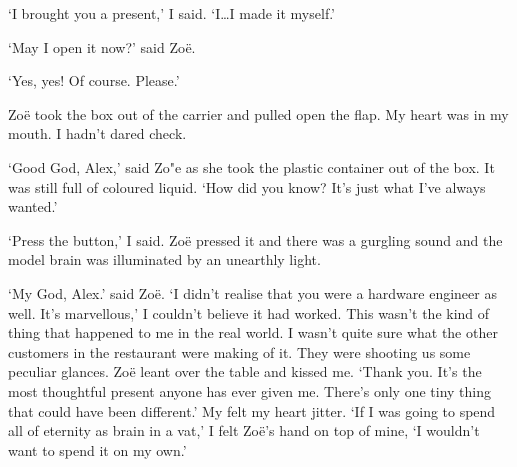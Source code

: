 `I brought you a present,' I said. `I\dots I made it myself.'

`May I open it now?' said Zoë.

`Yes, yes! Of course. Please.'

Zoë took the box out of the carrier and pulled open the flap. My
heart was in my mouth. I hadn't dared check.

`Good God, Alex,' said Zo{"e} as she took the plastic container out
of the box. It was still full of coloured liquid. `How did you know?
It's just what I've always wanted.'

`Press the button,' I said. Zoë pressed it and there was a
gurgling sound and the model brain was illuminated by an unearthly
light.

`My God, Alex.' said Zoë. `I didn't realise that you were a
hardware engineer as well. It's marvellous,' I couldn't believe it
had worked. This wasn't the kind of thing that happened to me in the
real world. I wasn't quite sure what the other customers in the
restaurant were making of it. They were shooting us some peculiar
glances. Zoë leant over the table and kissed me. `Thank you.
It's the most thoughtful present anyone has ever given me. There's
only one tiny thing that could have been different.' My felt my
heart jitter. `If I was going to spend all of eternity as brain in a
vat,' I felt Zoë's hand on top of mine, `I wouldn't want to
spend it on my own.'
\vfill\eject
